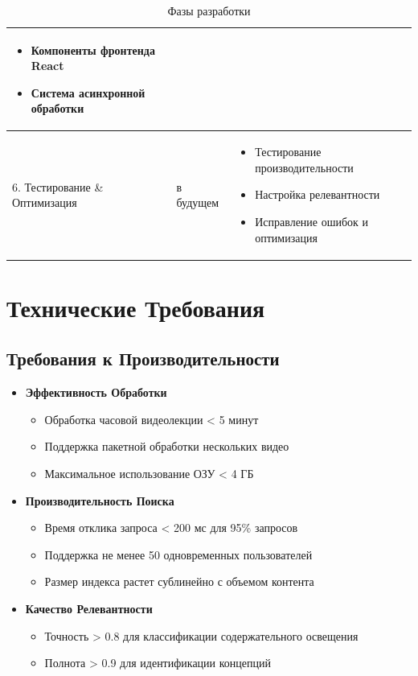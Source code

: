 \documentclass[12pt,a4paper]{article}
\begin{document}
\begin{table}[H]
\begin{tabular}{@{}llp{7cm}@{}}
\begin{itemize}[leftmargin=*, nosep]
    \item Компоненты фронтенда React
    \item Система асинхронной обработки
  \end{itemize} \\
\midrule
6. Тестирование \& Оптимизация & в будущем &
  \begin{itemize}[leftmargin=*, nosep]
    \item Тестирование производительности
    \item Настройка релевантности
    \item Исправление ошибок и оптимизация
  \end{itemize} \\
\bottomrule
\end{tabular}
\caption{Фазы разработки}
\end{table}

\section{Технические Требования}

\subsection{Требования к Производительности}

\begin{itemize}
    \item \textbf{Эффективность Обработки}
    \begin{itemize}
        \item Обработка часовой видеолекции < 5 минут
        \item Поддержка пакетной обработки нескольких видео
        \item Максимальное использование ОЗУ < 4 ГБ
    \end{itemize}

    \item \textbf{Производительность Поиска}
    \begin{itemize}
        \item Время отклика запроса < 200 мс для 95\% запросов
        \item Поддержка не менее 50 одновременных пользователей
        \item Размер индекса растет сублинейно с объемом контента
    \end{itemize}

    \item \textbf{Качество Релевантности}
    \begin{itemize}
        \item Точность > 0.8 для классификации содержательного освещения
        \item Полнота > 0.9 для идентификации концепций
    \end{itemize}
\end{itemize}
\end{document}

